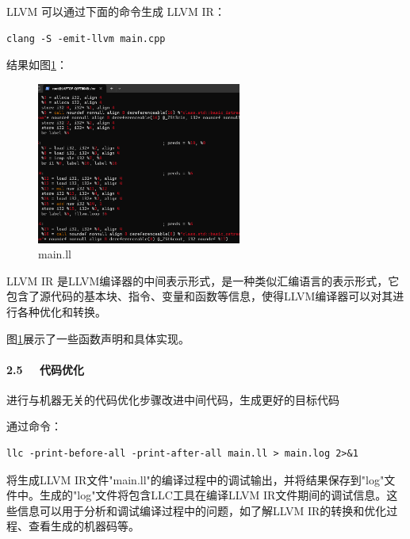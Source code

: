 \documentclass[UTF8,a4paper,10pt]{ctexart}
\begin{document}
LLVM 可以通过下面的命令生成 LLVM IR：
\begin{lstlisting}[frame=trbl]
  clang -S -emit-llvm main.cpp
\end{lstlisting}\par
结果如图\ref{fig:7}：
\begin{figure}[H]
    \centering
    \includegraphics[width=0.6\textwidth,height=0.6\textwidth]{imgs/mainll.png}
    \caption{main.ll}
    \label{fig:7}
\end{figure}
LLVM IR 是LLVM编译器的中间表示形式，是一种类似汇编语言的表示形式，它包含了源代码的基本块、指令、变量和函数等信息，使得LLVM编译器可以对其进行各种优化和转换。


图\ref{fig:7}展示了一些函数声明和具体实现。

\paragraph{2.5 \ \ 代码优化}
进行与机器无关的代码优化步骤改进中间代码，生成更好的目标代码


通过命令：
\begin{lstlisting}[frame=trbl]
  llc -print-before-all -print-after-all main.ll > main.log 2>&1
\end{lstlisting}\par
将生成LLVM IR文件"main.ll"的编译过程中的调试输出，并将结果保存到"log"文件中。生成的"log"文件将包含LLC工具在编译LLVM IR文件期间的调试信息。这些信息可以用于分析和调试编译过程中的问题，如了解LLVM IR的转换和优化过程、查看生成的机器码等。
\end{document}
